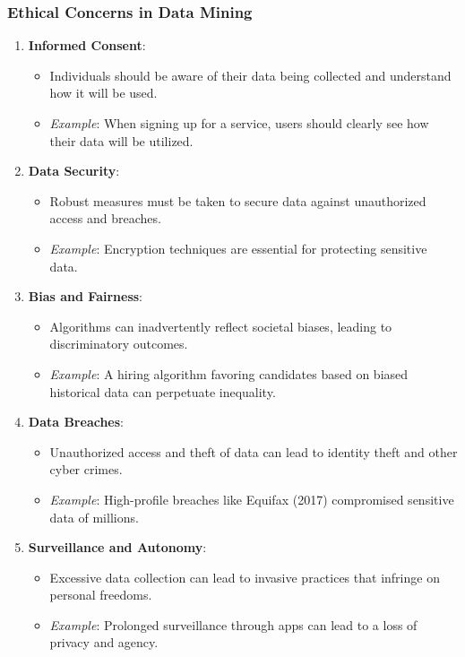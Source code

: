 \documentclass[aspectratio=169]{beamer}
\begin{document}
\begin{frame}[fragile]
  \frametitle{Ethical Concerns in Data Mining}
  \begin{enumerate}
    \item \textbf{Informed Consent}:
      \begin{itemize}
        \item Individuals should be aware of their data being collected and understand how it will be used.
        \item \textit{Example}: When signing up for a service, users should clearly see how their data will be utilized.
      \end{itemize}
      
    \item \textbf{Data Security}:
      \begin{itemize}
        \item Robust measures must be taken to secure data against unauthorized access and breaches.
        \item \textit{Example}: Encryption techniques are essential for protecting sensitive data.
      \end{itemize}
      
    \item \textbf{Bias and Fairness}:
      \begin{itemize}
        \item Algorithms can inadvertently reflect societal biases, leading to discriminatory outcomes.
        \item \textit{Example}: A hiring algorithm favoring candidates based on biased historical data can perpetuate inequality.
      \end{itemize}
      
    \item \textbf{Data Breaches}:
      \begin{itemize}
        \item Unauthorized access and theft of data can lead to identity theft and other cyber crimes.
        \item \textit{Example}: High-profile breaches like Equifax (2017) compromised sensitive data of millions.
      \end{itemize}

    \item \textbf{Surveillance and Autonomy}:
      \begin{itemize}
        \item Excessive data collection can lead to invasive practices that infringe on personal freedoms.
        \item \textit{Example}: Prolonged surveillance through apps can lead to a loss of privacy and agency.
      \end{itemize}
  \end{enumerate}
\end{frame}
\end{document}
